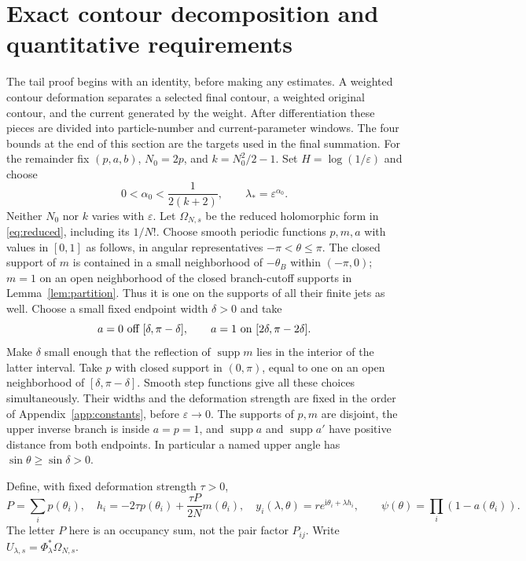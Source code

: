 \documentclass[11pt]{article}
\numberwithin{equation}{section}
\theoremstyle{definition}
\newcommand{\ii}{\mathrm i}
\newcommand{\eps}{\varepsilon}
\begin{document}


\section{Exact contour decomposition and quantitative requirements}
\label{sec:tailreduction}

The tail proof begins with an identity, before making any estimates.
A weighted contour deformation separates a selected final contour,
a weighted original contour, and the current generated by the weight.
After differentiation these pieces are divided into particle-number
and current-parameter windows. The four bounds at the end of this
section are the targets used in the final summation.
For the remainder fix \((p,a,b)\), \(N_0=2p\), and \(k=N_0^2/2-1\).
Set \(H=\log(1/\eps)\) and choose
\begin{equation}
 0<\alpha_0<\frac1{2(k+2)},\qquad \lambda_*=\eps^{\alpha_0}.
 \label{eq:alphachoice}
\end{equation}
Neither \(N_0\) nor \(k\) varies with \(\eps\).
Let \(\Omega_{N,s}\) be the reduced holomorphic form in
\eqref{eq:reduced}, including its \(1/N!\).
Choose smooth periodic functions \(p,m,a\) with values in \([0,1]\)
as follows, in angular representatives \(-\pi<\theta\le\pi\).
The closed support of \(m\) is contained in a small neighborhood of
\(-\theta_B\) within \((-\pi,0)\); \(m=1\) on an open neighborhood
of the closed branch-cutoff supports in Lemma~\ref{lem:partition}.
Thus it is one on the supports of all their finite jets as well.
Choose a small fixed endpoint width \(\delta>0\) and take
\[
 a=0\ \hbox{off }[\delta,\pi-\delta],\qquad
 a=1\ \hbox{on }[2\delta,\pi-2\delta].
\]
Make \(\delta\) small enough that the reflection of
\(\operatorname{supp}m\) lies in the interior of the latter interval.
Take \(p\) with closed support in \((0,\pi)\), equal to one on
an open neighborhood of \([\delta,\pi-\delta]\).
Smooth step functions give all these choices simultaneously.
Their widths and the deformation strength are fixed in the order
of Appendix~\ref{app:constants}, before \(\eps\to0\).
The supports of \(p,m\) are disjoint, the upper inverse branch is
inside \(a=p=1\), and \(\operatorname{supp}a\) and
\(\operatorname{supp}a'\) have positive distance from both endpoints.
In particular a named upper angle has \(\sin\theta\ge\sin\delta>0\).

Define, with fixed deformation strength \(\tau>0\),
\[
 P=\sum_i p(\theta_i),\quad
 h_i=-2\tau p(\theta_i)+\frac{\tau P}{2N}m(\theta_i),\quad
 y_i(\lambda,\theta)=r e^{\ii\theta_i+\lambda h_i},
 \qquad \psi(\theta)=\prod_i(1-a(\theta_i)).
\]
The letter \(P\) here is an occupancy sum, not the pair factor \(P_{ij}\).
Write \(U_{\lambda,s}=\Phi_\lambda^*\Omega_{N,s}\).
\end{document}

